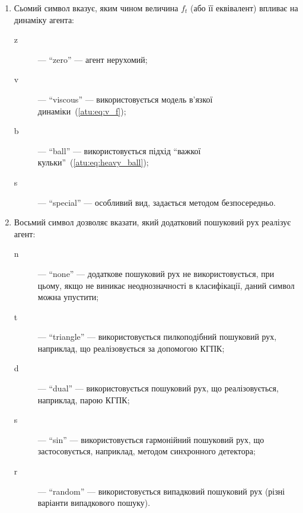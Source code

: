 \begin{enumerate}
\begin{description}
    \end{description}

  \item
    Сьомий символ
    вказує, яким чином величина $f_t$ (або її еквівалент) впливає на динаміку агента:
    \begin{description}

      \item[z]  --- ``zero'' ---
        агент нерухомий;

      \item[v] --- ``viscous'' ---
        використовується модель в'язкої динаміки~(\ref{atu:eq:v_f});

      \item[b] --- ``ball'' ---
        використовується підхід ``важкої кульки''~(\ref{atu:eq:heavy_ball});

      \item[s] --- ``special'' ---
        особливий вид, задається методом безпосередньо.

    \end{description}

  \item
    Восьмий символ дозволяє вказати,
    який додатковий пошуковий рух реалізує агент:
    \begin{description}

      \item[n]  --- ``none'' ---
        додаткове пошуковий рух не використовується, при цьому, якщо
        не виникає неоднозначності в класифікації, даний символ можна
        упустити;

      \item[t] --- ``triangle'' ---
        використовується пилкоподібний пошуковий рух, наприклад, що
        реалізовується за допомогою КГПК;

      \item[d] --- ``dual'' ---
        використовується пошуковий рух, що реалізовується, наприклад,
        парою КГПК;

      \item[s] --- ``sin'' ---
        використовується гармонійний пошуковий рух, що застосовується,
        наприклад, методом синхронного детектора;

      \item[r] --- ``random'' ---
        використовується випадковий пошуковий рух (різні варіанти
        випадкового пошуку).

    \end{description}



\end{enumerate}
